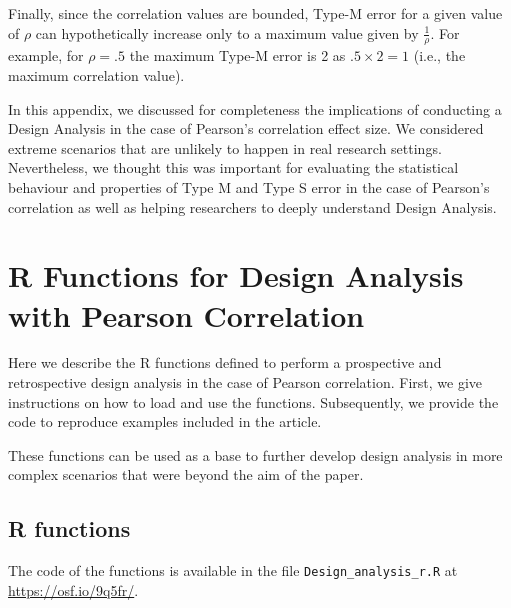 \documentclass{article}\usepackage[]{graphicx}\usepackage[]{color}
\begin{document}
\begin{refsection}
Finally, since the correlation values are bounded, Type-M error for a given value of $\rho$ can hypothetically increase only to a maximum value given by $\frac{1}{\rho}$. For example, for $\rho = .5$ the maximum Type-M error is 2 as $.5\times 2 = 1$ (i.e., the maximum correlation value).

In this appendix, we discussed for completeness the implications of conducting a Design Analysis in the case of Pearson's correlation effect size. We considered extreme scenarios that are unlikely to happen in real research settings. Nevertheless, we thought this was important for evaluating the statistical behaviour and properties of Type M and Type S error in the case of Pearson's correlation as well as helping researchers to deeply understand Design Analysis.

\clearpage


\section{R Functions for Design Analysis\\ with Pearson Correlation}\label{sec:appendix_b}
\setcounter{figure}{0}
\setcounter{equation}{0}

Here we describe the R functions defined to perform a prospective and retrospective design analysis in the case of Pearson correlation. First, we give instructions on how to load and use the functions. Subsequently, we provide the code to reproduce examples included in the article.

These functions can be used as a base to further develop design analysis in more complex scenarios that were beyond the aim of the paper.

\subsection{R functions}

The code of the functions is available in the file \texttt{Design\_analysis\_r.R} at \url{https://osf.io/9q5fr/}.


\end{refsection}
\end{document}
